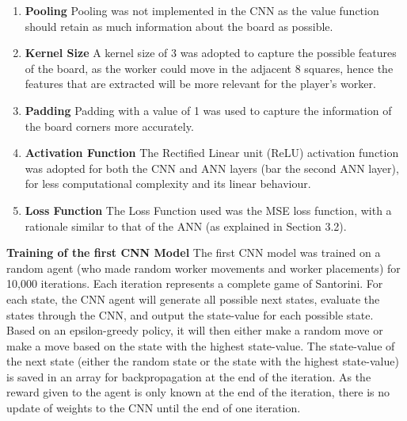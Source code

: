 \documentclass[a4paper,12pt,table]{article}
\begin{document}
\begin{enumerate}
    \item \textbf{Pooling}
    \newline
    Pooling was not implemented in the CNN as the value function should retain as much information about the board as possible. 
    
    \item \textbf{Kernel Size}
    \newline
    A kernel size of 3 was adopted to capture the possible features of the board, as the worker could move in the adjacent 8 squares, hence the features that are extracted will be more relevant for the player’s worker.
    
    \item \textbf{Padding}
    \newline
    Padding with a value of 1 was used to capture the information of the board corners more accurately.
    
    \item \textbf{Activation Function}
    \newline
    The Rectified Linear unit (ReLU) activation function was adopted for both the CNN and ANN layers (bar the second ANN layer), for less computational complexity and its linear behaviour.

    \item \textbf{Loss Function}
    \newline
    The Loss Function used was the MSE loss function, with a rationale similar to that of the ANN (as explained in Section 3.2).
\end{enumerate}

\textbf{Training of the first CNN Model}
\newline
The first CNN model was trained on a random agent (who made random worker movements and worker placements) for 10,000 iterations. Each iteration represents a complete game of Santorini. For each state, the CNN agent will generate all possible next states, evaluate the states through the CNN, and output the state-value for each possible state. Based on an epsilon-greedy policy, it will then either make a random move or make a move based on the state with the highest state-value. The state-value of the next state (either the random state or the state with the highest state-value) is saved in an array for backpropagation at the end of the iteration. As the reward given to the agent is only known at the end of the iteration, there is no update of weights to the CNN until the end of one iteration. \par
\end{document}
